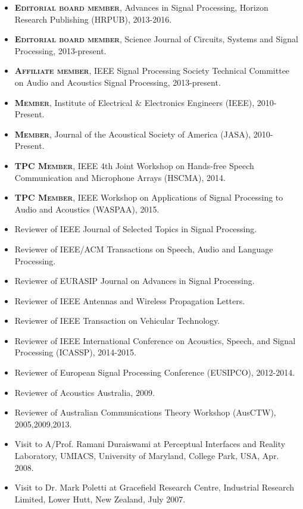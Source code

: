 \documentclass[10pt]{article}
\begin{document}
\begin{itemize}
%
\item \textsc{\textbf{Editorial board member}}, Advances in Signal Processing, Horizon Research Publishing (HRPUB), 2013-2016.
\item \textsc{\textbf{Editorial board member}}, Science Journal of Circuits, Systems and Signal Processing, 2013-present.
\item \textsc{\textbf{Affiliate member}}, IEEE Signal Processing Society Technical Committee on Audio and Acoustics Signal Processing, 2013-present.
\item \textsc{\textbf{Member}}, Institute of Electrical $\&$ Electronics Engineers (IEEE), 2010-Present.
\item \textsc{\textbf{Member}}, Journal of the Acoustical Society of America (JASA), 2010-Present.
\item \textsc{\textbf{TPC Member}}, IEEE 4th Joint Workshop on Hands-free Speech Communication and Microphone Arrays (HSCMA), 2014.
\item \textsc{\textbf{TPC Member}}, IEEE Workshop on Applications of Signal Processing to Audio and Acoustics (WASPAA), 2015.
\item Reviewer of IEEE Journal of Selected Topics in Signal Processing.
\item Reviewer of IEEE/ACM Transactions on Speech, Audio and Language Processing.
\item Reviewer of EURASIP Journal on Advances in Signal Processing.
\item Reviewer of IEEE Antennas and Wireless Propagation Letters.
\item Reviewer of IEEE Transaction on Vehicular Technology.

\item Reviewer of IEEE International Conference on Acoustics, Speech, and Signal Processing (ICASSP), 2014-2015.
\item Reviewer of European Signal Processing Conference (EUSIPCO), 2012-2014.
\item Reviewer of Acoustics Australia, 2009.
\item Reviewer of Australian Communications Theory Workshop (AusCTW), 2005,2009,2013.
\item Visit to A/Prof. Ramani Duraiswami at Perceptual Interfaces and Reality Laboratory, UMIACS,
University of Maryland, College Park, USA, Apr. 2008.
\item Visit to Dr. Mark Poletti at Gracefield Research Centre, Industrial Research Limited, Lower Hutt, New
Zealand, July 2007.
\end{itemize}
\end{document}
